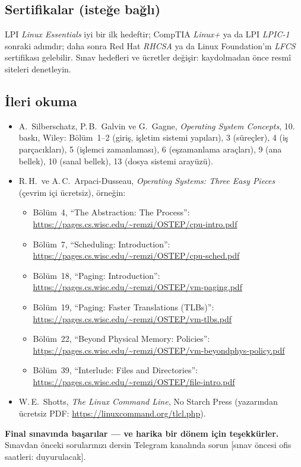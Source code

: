 \subsection*{Sertifikalar (isteğe bağlı)}
LPI \emph{Linux Essentials} iyi bir ilk hedeftir; CompTIA \emph{Linux+} ya da LPI \emph{LPIC-1} sonraki adımdır; daha sonra Red Hat \emph{RHCSA} ya da Linux Foundation'ın \emph{LFCS} sertifikası gelebilir. Sınav hedefleri ve ücretler değişir: kaydolmadan önce resmî siteleri denetleyin.

\subsection*{İleri okuma}
\begin{itemize}
  \item A.\ Silberschatz, P.\,B.\ Galvin ve G.\ Gagne, \emph{Operating System Concepts}, 10. baskı, Wiley: Bölüm~1--2 (giriş, işletim sistemi yapıları), 3 (süreçler), 4 (iş parçacıkları), 5 (işlemci zamanlaması), 6 (eşzamanlama araçları), 9 (ana bellek), 10 (sanal bellek), 13 (dosya sistemi arayüzü).
  \item R.\,H.\ ve A.\,C.\ Arpaci-Dusseau, \emph{Operating Systems: Three Easy Pieces} (çevrim içi ücretsiz), örneğin:
  \begin{itemize}
    \item Bölüm~4, ``The Abstraction: The Process'': \url{https://pages.cs.wisc.edu/~remzi/OSTEP/cpu-intro.pdf}
    \item Bölüm~7, ``Scheduling: Introduction'': \url{https://pages.cs.wisc.edu/~remzi/OSTEP/cpu-sched.pdf}
    \item Bölüm~18, ``Paging: Introduction'': \url{https://pages.cs.wisc.edu/~remzi/OSTEP/vm-paging.pdf}
    \item Bölüm~19, ``Paging: Faster Translations (TLBs)'': \url{https://pages.cs.wisc.edu/~remzi/OSTEP/vm-tlbs.pdf}
    \item Bölüm~22, ``Beyond Physical Memory: Policies'': \url{https://pages.cs.wisc.edu/~remzi/OSTEP/vm-beyondphys-policy.pdf}
    \item Bölüm~39, ``Interlude: Files and Directories'': \url{https://pages.cs.wisc.edu/~remzi/OSTEP/file-intro.pdf}
  \end{itemize}
  \item W.\,E.\ Shotts, \emph{The Linux Command Line}, No Starch Press (yazarından ücretsiz PDF: \url{https://linuxcommand.org/tlcl.php}).
\end{itemize}

\textbf{Final sınavında başarılar --- ve harika bir dönem için teşekkürler.} Sınavdan önceki sorularınızı dersin Telegram kanalında sorun [sınav öncesi ofis saatleri: duyurulacak].

